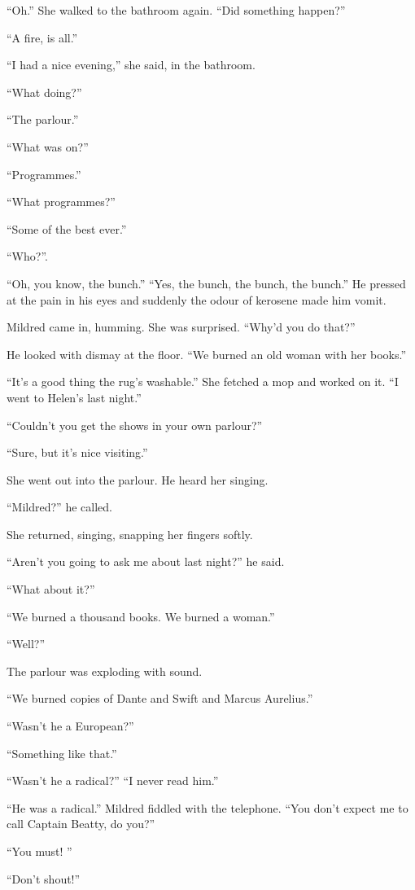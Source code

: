 \documentclass[11pt,openany]{book}
\begin{document}
``Oh.'' She walked to the bathroom again. ``Did something happen?''

``A fire, is all.''

``I had a nice evening,'' she said, in the bathroom.

``What doing?''

``The parlour.''

``What was on?''

``Programmes.''

``What programmes?''

``Some of the best ever.''

``Who?''.

``Oh, you know, the bunch.'' ``Yes, the bunch, the bunch, the bunch.'' He pressed at the pain in his eyes and suddenly the odour of kerosene made him vomit.

Mildred came in, humming. She was surprised. ``Why'd you do that?''

He looked with dismay at the floor. ``We burned an old woman with her books.''

``It's a good thing the rug's washable.'' She fetched a mop and worked on it. ``I went to Helen's last night.''

``Couldn't you get the shows in your own parlour?''

``Sure, but it's nice visiting.''

She went out into the parlour. He heard her singing.

``Mildred?'' he called.

She returned, singing, snapping her fingers softly.

``Aren't you going to ask me about last night?'' he said.

``What about it?''

``We burned a thousand books. We burned a woman.''

``Well?''

The parlour was exploding with sound.

``We burned copies of Dante and Swift and Marcus Aurelius.''

``Wasn't he a European?''

``Something like that.''

``Wasn't he a radical?'' ``I never read him.''

``He was a radical.'' Mildred fiddled with the telephone. ``You don't expect me to call Captain Beatty, do you?''

``You must! ''

``Don't shout!''
\end{document}
